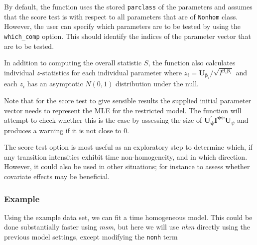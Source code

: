 \documentclass{article}
\numberwithin{equation}{section}
\begin{document}
By default, the function uses the stored \verb!parclass! of the parameters and assumes that the score test is with respect to all parameters that are of \verb!Nonhom! class. However, the user can specify which parameters are to be tested by using the \verb!which_comp! option. This should identify the indices of the parameter vector that are to be tested.

In addition to computing the overall statistic $S$, the function also calculates individual $z$-statistics for each individual parameter where
$z_i = \mathbf{U}_{\bm\beta_i} / \sqrt{I^{\bm\beta_i \bm\beta_i}}$ and each $z_i$ has an asymptotic $N(0,1)$ distribution under the null.

Note that for the score test to give sensible results the supplied initial parameter vector needs to represent the MLE for the restricted model. The function will attempt to check whether this is the case by assessing the size of $\mathbf{U}^{'}_{\bm\psi} \mathbf{I}^{\bm\psi \bm\psi} \mathbf{U}_{\psi}$ and produces a warning if it is not close to 0.

The score test option is most useful as an exploratory step to determine which, if any transition intensities exhibit time non-homogeneity, and in which direction. However, it could also be used in other situations; for instance to assess whether covariate effects may be beneficial.

\subsubsection{Example}

Using the example data set, we can fit a time homogeneous model. This could be done substantially faster using {\it msm}, but here we will use {\it nhm} directly using the previous model settings, except modifying the \verb!nonh! term
\end{document}

